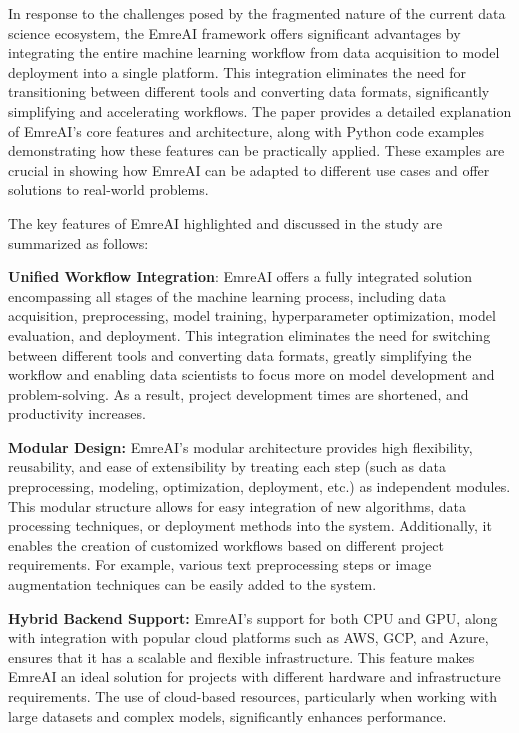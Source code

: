 \documentclass[conference]{IEEEtran}
\begin{document}
In response to the challenges posed by the fragmented nature of the current data science ecosystem, the EmreAI framework offers significant advantages by integrating the entire machine learning workflow from data acquisition to model deployment into a single platform. This integration eliminates the need for transitioning between different tools and converting data formats, significantly simplifying and accelerating workflows. The paper provides a detailed explanation of EmreAI's core features and architecture, along with Python code examples demonstrating how these features can be practically applied. These examples are crucial in showing how EmreAI can be adapted to different use cases and offer solutions to real-world problems.

The key features of EmreAI highlighted and discussed in the study are summarized as follows:

\textbf{Unified Workflow Integration}: EmreAI offers a fully integrated solution encompassing all stages of the machine learning process, including data acquisition, preprocessing, model training, hyperparameter optimization, model evaluation, and deployment. This integration eliminates the need for switching between different tools and converting data formats, greatly simplifying the workflow and enabling data scientists to focus more on model development and problem-solving. As a result, project development times are shortened, and productivity increases.
  
\textbf{Modular Design: }EmreAI's modular architecture provides high flexibility, reusability, and ease of extensibility by treating each step (such as data preprocessing, modeling, optimization, deployment, etc.) as independent modules. This modular structure allows for easy integration of new algorithms, data processing techniques, or deployment methods into the system. Additionally, it enables the creation of customized workflows based on different project requirements. For example, various text preprocessing steps or image augmentation techniques can be easily added to the system.

\textbf{Hybrid Backend Support:} EmreAI's support for both CPU and GPU, along with integration with popular cloud platforms such as AWS, GCP, and Azure, ensures that it has a scalable and flexible infrastructure. This feature makes EmreAI an ideal solution for projects with different hardware and infrastructure requirements. The use of cloud-based resources, particularly when working with large datasets and complex models, significantly enhances performance.
\end{document}

